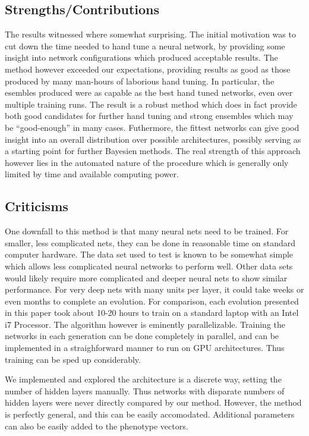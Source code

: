\documentclass{article}
\DeclareMathOperator{\1}{\mathbbm{1}}
\begin{document}
\subsection{Strengths/Contributions}

The results witnessed where somewhat surprising. The initial motivation was to cut down the time needed to hand tune a neural network,
by providing some insight into network configurations which produced acceptable results. The method however exceeded our expectations, 
providing results as good as those produced by many man-hours of laborious hand tuning. In particular, the esembles produced were as capable
as the best hand tuned networks, even over multiple training runs. The result is a robust method which does in fact provide both good candidates
for further hand tuning and strong ensembles which may be ``good-enough'' in many cases. Futhermore, the fittest networks can give good insight
into an overall distribution over possible architectures, possibly serving as a starting point for further Bayesien methods. The real strength
of this approach however lies in the automated nature of the procedure which is generally only limited by time and available computing power.

\subsection{Criticisms}
One downfall to this method is that many neural nets need to be trained. For smaller, less complicated nets, they can be done in
reasonable time on standard computer hardware. The data set used to test is known to be somewhat simple which allows less 
complicated neural networks to perform well. Other data sets would likely require more complicated and deeper neural nets to show
similar performance. For very deep nets with many units per layer, it could take weeks or even
months to complete an evolution. For comparison, each evolution presented in this paper took about 10-20 hours to
train on a standard laptop with an Intel i7 Processor. The algorithm however is eminently parallelizable. Training the networks 
in each generation can be done completely in parallel, and can be implemented in a straighforward manner to run on GPU architectures.
Thus training can be sped up considerably. 

We implemented and explored the architecture is a discrete way, setting the number of hidden layers manually. Thus networks with disparate 
numbers of hidden layers were never directly compared by our method. However, the method is perfectly general, and this can be easily accomodated.
Additional parameters can also be easily added to the phenotype vectors. 
\end{document}
